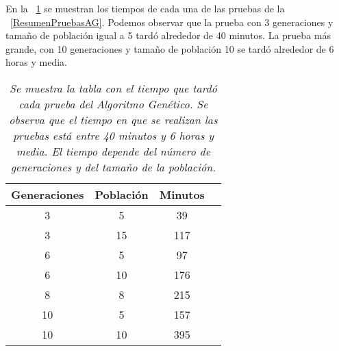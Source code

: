 En la \tablename{~\ref{TiempoPruebasAG}} se muestran los tiempos de cada una de las pruebas de la \tablename{~\ref{ResumenPruebasAG}}. Podemos observar que la prueba con 3 generaciones y tamaño de población igual a 5 tardó alrededor de 40 minutos. La prueba más grande, con 10 generaciones y tamaño de población 10 se tardó alrededor de 6 horas y media.



\begin{table}[H]
\centering
\begin{tabular}{|c|c|c|c|}
\hline 
 \textbf{Generaciones} & \textbf{Población} & \textbf{Minutos} \\ \hline
 3 & 5 & 39  \\ \hline
 3 & 15 & 117 \\ \hline
 6 & 5 & 97 \\ \hline
 6 & 10 & 176 \\ \hline
 8 & 8 & 215\\ \hline
 10 & 5 & 157 \\ \hline
 10 & 10 & 395 \\ \hline
\end{tabular}
\caption[\textit{Tiempo de las pruebas del Algoritmo Genético}]{\textit{Se muestra la tabla con el tiempo que tardó cada prueba del Algoritmo Genético. Se observa que el tiempo en que se realizan las pruebas está entre 40 minutos y 6 horas y media. El tiempo depende del número de generaciones y del tamaño de la población.}}\label{TiempoPruebasAG}
\end{table}

